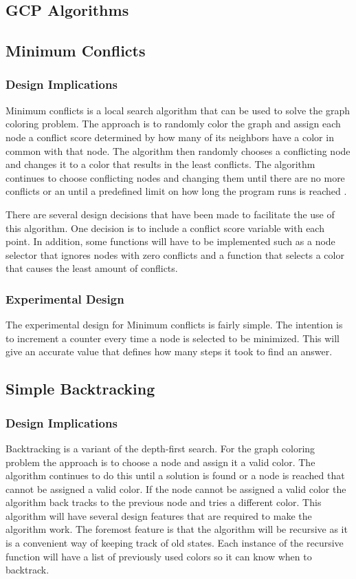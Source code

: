 \documentclass{article}
\begin{document}
\begin{multicols}{2}
\section{GCP Algorithms}
\label{algorithms}

\subsection{Minimum Conflicts}
\subsubsection{Design Implications}
Minimum conflicts is a local search algorithm that can be used to solve the graph coloring problem. The approach is to randomly color the graph and assign each node a conflict score determined by how many of its neighbors have a color in common with that node. The algorithm then randomly chooses a conflicting node and changes it to a color that results in the least conflicts. The algorithm continues to choose conflicting nodes and changing them until there are no more conflicts or an until a predefined limit on how long the program runs is reached \cite{ai}. \par
There are several design decisions that have been made to facilitate the use of this algorithm. One decision is to include a conflict score variable with each point. In addition, some functions will have to be implemented such as a node selector that ignores nodes with zero conflicts and a function that selects a color that causes the least amount of conflicts.
\subsubsection{Experimental Design}
The experimental design for Minimum conflicts is fairly simple. The intention is to increment a counter every time a node is selected to be minimized. This will give an accurate value that defines how many steps it took to find an answer.

\subsection{Simple Backtracking}
\subsubsection{Design Implications}
Backtracking is a variant of the depth-first search. For the graph coloring problem the approach is to choose a node and assign it a valid color. The algorithm continues to do this until a solution is found or a node is reached that cannot be assigned a valid color. If the node cannot be assigned a valid color the algorithm back tracks to the previous node and tries a different color.  
This algorithm will have several design features that are required to make the algorithm work. The foremost feature is that the algorithm will be recursive as it is a convenient way of keeping track of old states. Each instance of the recursive function will have a list of previously used colors so it can know when to backtrack. 

\end{multicols}
\end{document}
